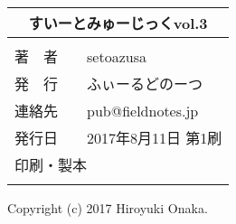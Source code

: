 \newpage
\pagestyle{fancy}
\lhead[]{}
\chead[]{}
\rhead[]{}


\begin{center}
    \vspace*{95mm} %

\begin{tabular}{l}
\multicolumn{1}{c}{\Large{すいーとみゅーじっくvol.3}}\\[3mm] %
\hline
\\[-3mm]
\hspace{2mm}\large{著　者　　}\hspace{5mm}setoazusa\\[0mm] 
\hspace{2mm}\large{発　行　　}\hspace{5mm}ふぃーるどのーつ\\[0mm] 
\hspace{2mm}\large{連絡先　　}\hspace{5mm}pub@fieldnotes.jp\\[0mm] 
\hspace{2mm}\large{発行日　　}\hspace{5mm}2017年8月11日 第1刷\\[0mm]
\hspace{2mm}\large{印刷・製本}\hspace{5mm}{日光企画}\\[0mm]
\\\hline
\end{tabular}
\end{center}
\begin{center}
Copyright (c) 2017 Hiroyuki Onaka.
\end{center}


